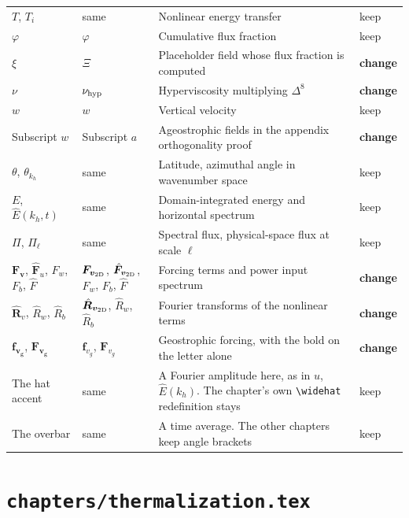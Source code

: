 \documentclass[11pt,a4paper]{article}
\renewcommand{\vec}[1]{\boldsymbol{#1}}
\newcommand{\chg}{\textbf{change}}
\newcommand{\kp}{keep}
\begin{document}
\begin{longtable}{@{}p{3.1cm} p{3.1cm} p{8.6cm} p{1.6cm}@{}}
$T$, $T_i$ & same & Nonlinear energy transfer & \kp \\
$\varphi$ & $\varphi$ & Cumulative flux fraction & \kp \\
$\xi$ & $\varXi$ & Placeholder field whose flux fraction is computed & \chg \\
$\nu$ & $\nu_{\rm hyp}$ & Hyperviscosity multiplying $\Delta^8$ & \chg \\
$w$ & $w$ & Vertical velocity & \kp \\
Subscript $w$ & Subscript $a$ & Ageostrophic fields in the appendix orthogonality proof & \chg \\
$\theta$, $\theta_{k_h}$ & same & Latitude, azimuthal angle in wavenumber space & \kp \\
$E$, $\hat{E}(k_h,t)$ & same & Domain-integrated energy and horizontal spectrum & \kp \\
$\Pi$, $\Pi_\ell$ & same & Spectral flux, physical-space flux at scale $\ell$ & \kp \\
$\vec{F}_{\vec{v}}$, $\hat{\vec{F}}_u$, $F_w$, $F_b$, $\hat{F}$ & $\vec{F}_{\vec{v}_{\rm 2D}}$, $\hat{\vec{F}}_{\vec{v}_{\rm 2D}}$, $F_w$, $F_b$, $\hat{F}$ & Forcing terms and power input spectrum & \chg \\
$\hat{\vec{R}}_{v}$, $\hat{R}_w$, $\hat{R}_b$ & $\hat{\vec{R}}_{\vec{v}_{\rm 2D}}$, $\hat{R}_w$, $\hat{R}_b$ & Fourier transforms of the nonlinear terms & \chg \\
$\vec{f_{v_g}}$, $\vec{F_{v_g}}$ & $\vec{f}_{v_g}$, $\vec{F}_{v_g}$ & Geostrophic forcing, with the bold on the letter alone & \chg \\
The hat accent & same & A Fourier amplitude here, as in $\hat{u}$, $\hat{E}(k_h)$. The chapter's own \verb|\widehat| redefinition stays & \kp \\
The overbar & same & A time average. The other chapters keep angle brackets & \kp \\
\bottomrule
\end{longtable}

\section*{\texttt{chapters/thermalization.tex}}
\end{document}
